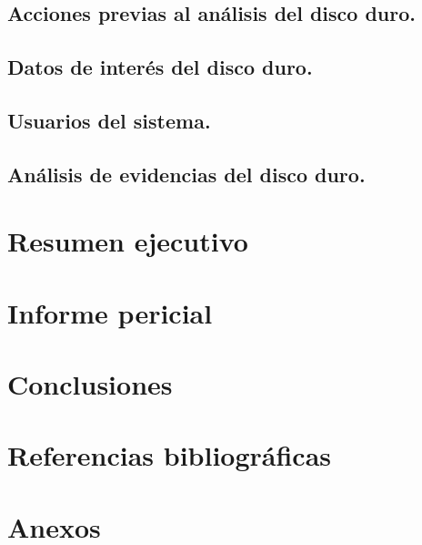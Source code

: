 \documentclass[12pt,a4paper]{report}
\begin{document}
\section{Acciones previas al análisis del disco duro.}


\section{Datos de interés del disco duro.}


\section{Usuarios del sistema.}


\section{Análisis de evidencias del disco duro.}


\chapter{Resumen ejecutivo}


\chapter{Informe pericial}


\chapter{Conclusiones}


\chapter{Referencias bibliográficas}


\chapter{Anexos}

\end{document}
